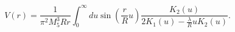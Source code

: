 \begin{equation}
\label{rev4}
V(r) = \frac{1}{\pi^2 M_5^3 R r} \int_0^{\infty} du 
\sin \left( \frac{r}{R} u \right)
\frac{K_2(u)}{2 K_1(u) - \frac{\lambda}{R} u K_2(u)}.
\end{equation}

